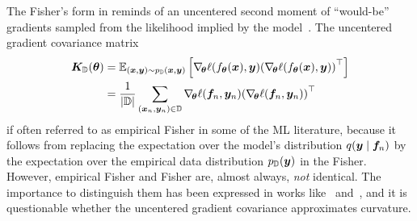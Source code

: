 The Fisher's form in  reminds of
an uncentered second moment of ``would-be'' gradients sampled from the
likelihood implied by the model~\cite{papyan2020traces}. The uncentered gradient
covariance matrix
\begin{align}\label{eq:background::uncenteredGradientCovariance}
  \begin{split}
    {\bm{K}}_{{\mathbb{D}}}({\bm{\theta}})
    &=
      \mathbb{E}_{({\bm{x}}, {\bm{y}}) \sim p_{\mathbb{D}}({\bm{x}}, {\bm{y}})}
      \left[
      \nabla_{\!{{\bm{\theta}}}} \ell(f_{{\bm{\theta}}}({\bm{x}}), {\bm{y}})
      {(\nabla_{\!{{\bm{\theta}}}} \ell(f_{{\bm{\theta}}}({\bm{x}}), {\bm{y}}))}^{\top}
      \right]
    \\
    &=
      \frac{1}{|{\mathbb{D}}|}
      \sum_{({\bm{x}}_n, {\bm{y}}_n) \in {\mathbb{D}}}
      \nabla_{\!{{\bm{\theta}}}} \ell({\bm{f}}_{n}, {\bm{y}}_n)
      {(\nabla_{\!{{\bm{\theta}}}} \ell({\bm{f}}_{n}, {\bm{y}}_n))}^{\top}
  \end{split}
\end{align}
if often referred to as empirical Fisher in some of the ML literature, because
it follows from replacing the expectation over the model's distribution
$q({\bm{y}}\;|\;{\bm{f}}_{n})$ by the expectation over the empirical data
distribution $p_{{\mathbb{D}}}({\bm{y}})$ in the Fisher. However, empirical Fisher and Fisher
are, almost always, \emph{not} identical. The importance to distinguish them has
been expressed in works like~\cite{kunstner2019limitations}
and~\cite{thomas2020interplay}, and it is questionable whether the uncentered
gradient covariance 
approximates curvature.

